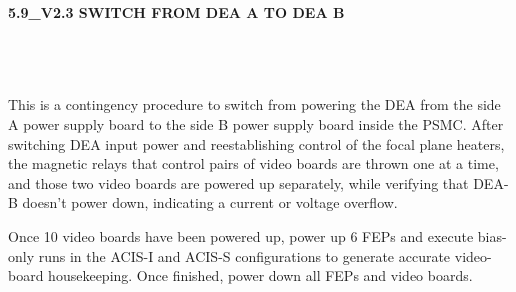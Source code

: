 \documentclass[11pt]{article}
\begin{document}
\newcommand{\be}{\begin{enumerate}}
\newcommand{\ee}{\end{enumerate}}
\newcommand{\bc}{\begin{center}}
\newcommand{\ec}{\end{center}}
\newcommand{\bi}{\begin{itemize}}
\newcommand{\ei}{\end{itemize}}
\newcommand{\bd}{\begin{description}}
\newcommand{\ed}{\end{description}}
\newcommand{\bt}{\begin{tabbing}}
\newcommand{\et}{\end{tabbing}}
\newcommand{\eg}{{\it e.g.~}}
\newcommand{\ie}{{\it i.e.~}}
\newcommand{\ul}{\underline}
\newcommand{\axaf}{{\em AXAF}}
\def\la{\hbox{\rlap{$<$}\lower0.5ex\hbox{$\sim$}\ }}

\centerline{\large {\bf 5.9\_V2.3 SWITCH FROM DEA A TO DEA B }}
\vspace{0.25in}

\\
 \\


\\

This is a contingency procedure to switch from powering the DEA 
from the side A power supply board to the side B power supply board inside 
the PSMC. After switching DEA input power and reestablishing control of the
focal plane heaters, the magnetic relays that control pairs of video boards 
are thrown one at a time, and those two video boards are powered up separately,
while verifying that DEA-B doesn't power down, indicating a current or voltage 
overflow.

Once 10 video boards have been powered up, power up 6 FEPs and execute bias-only 
runs in the ACIS-I and ACIS-S configurations to generate accurate video-board 
housekeeping. Once finished, power down all FEPs and video boards.

\vspace{0.15in}
\end{document}
